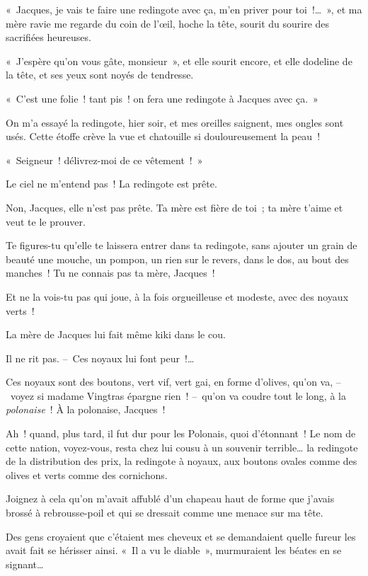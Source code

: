 \documentclass[french,twoside]{book} %
\begin{document}
« Jacques, je vais te faire une redingote avec ça, m’en priver pour toi !… », et ma mère ravie me regarde du coin de l’œil, hoche la tête, sourit du sourire des sacrifiées heureuses.\par
« J’espère qu’on vous gâte, monsieur », et elle sourit encore, et elle dodeline de la tête, et ses yeux sont noyés de tendresse.\par
« C’est une folie ! tant pis ! on fera une redingote à Jacques avec ça. »\par
On m’a essayé la redingote, hier soir, et mes oreilles saignent, mes ongles sont usés. Cette étoffe crève la vue et chatouille si douloureusement la peau !\par
« Seigneur ! délivrez-moi de ce vêtement ! »\par
Le ciel ne m’entend pas ! La redingote est prête.\par
Non, Jacques, elle n’est pas prête. Ta mère est fière de toi ; ta mère t’aime et veut te le prouver.\par
Te figures-tu qu’elle te laissera entrer dans ta redingote, sans ajouter un grain de beauté une mouche, un pompon, un rien sur le revers, dans le dos, au bout des manches ! Tu ne connais pas ta mère, Jacques !\par
Et ne la vois-tu pas qui joue, à la fois orgueilleuse et modeste, avec des noyaux verts !\par
La mère de Jacques lui fait même kiki dans le cou.\par
Il ne rit pas. – Ces noyaux lui font peur !…\par
Ces noyaux sont des boutons, vert vif, vert gai, en forme d’olives, qu’on va, – voyez si madame Vingtras épargne rien ! – qu’on va coudre tout le long, à la \emph{polonaise} ! À la polonaise, Jacques !\par
Ah ! quand, plus tard, il fut dur pour les Polonais, quoi d’étonnant ! Le nom de cette nation, voyez-vous, resta chez lui cousu à un souvenir terrible… la redingote de la distribution des prix, la redingote à noyaux, aux boutons ovales comme des olives et verts comme des cornichons.\par
Joignez à cela qu’on m’avait affublé d’un chapeau haut de forme que j’avais brossé à rebrousse-poil et qui se dressait comme une menace sur ma tête.\par
Des gens croyaient que c’étaient mes cheveux et se demandaient quelle fureur les avait fait se hérisser ainsi. « Il a vu le diable », murmuraient les béates en se signant…\par
\end{document}
